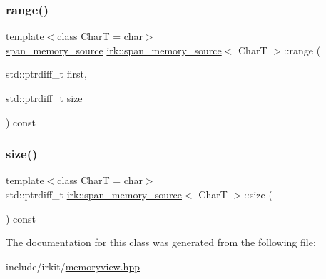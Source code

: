 \mbox{\label{classirk_1_1span__memory__source_aec190b78f31c5d7a005eb4b89d28939c}} 
\subsubsection{\texorpdfstring{range()}{range()}}
{\footnotesize\ttfamily template$<$class CharT  = char$>$ \\
\mbox{\hyperlink{classirk_1_1span__memory__source}{span\+\_\+memory\+\_\+source}} \mbox{\hyperlink{classirk_1_1span__memory__source}{irk\+::span\+\_\+memory\+\_\+source}}$<$ CharT $>$\+::range (\begin{DoxyParamCaption}\item[{std\+::ptrdiff\+\_\+t}]{first,  }\item[{std\+::ptrdiff\+\_\+t}]{size }\end{DoxyParamCaption}) const\hspace{0.3cm}{\ttfamily [inline]}}

\mbox{\label{classirk_1_1span__memory__source_a6ab9aa714bdb0289f05cf68c153d1161}} 
\subsubsection{\texorpdfstring{size()}{size()}}
{\footnotesize\ttfamily template$<$class CharT  = char$>$ \\
std\+::ptrdiff\+\_\+t \mbox{\hyperlink{classirk_1_1span__memory__source}{irk\+::span\+\_\+memory\+\_\+source}}$<$ CharT $>$\+::size (\begin{DoxyParamCaption}{ }\end{DoxyParamCaption}) const\hspace{0.3cm}{\ttfamily [inline]}}



The documentation for this class was generated from the following file\+:\begin{DoxyCompactItemize}
\item 
include/irkit/\mbox{\hyperlink{memoryview_8hpp}{memoryview.\+hpp}}\end{DoxyCompactItemize}
